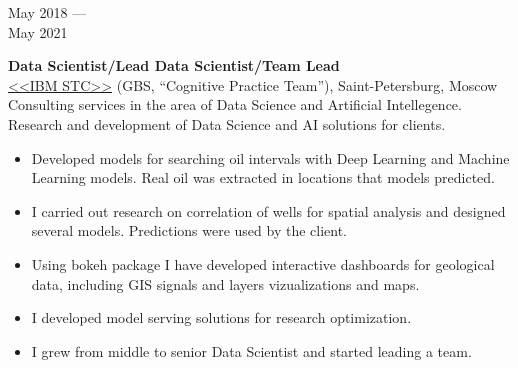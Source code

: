 \documentclass[10pt,a4paper]{article}
\newcommand{\lmpratio}{0.15}
\newcommand{\rmpratio}{0.74}
\newcommand{\vSpace}{0.5cm}
\newcommand{\horizontalSpace}{0.05\textwidth}
\newcommand{\sectionMain}[1]{\textbf{#1}}
\begin{document}
	\begin{minipage}[t]{\lmpratio\textwidth}
		May 2018 --- \\May 2021
	\end{minipage}
	\hspace{\horizontalSpace}
	\begin{minipage}[t]{\rmpratio\textwidth}
		\sectionMain{Data Scientist/Lead Data Scientist/Team Lead}\\
		\href{https://www.ibm.com/ru/rstl/index-en.html}{<<IBM STC>>} (GBS, ``Cognitive Practice Team''), Saint-Petersburg, Moscow\\[0.1cm]
  
Consulting services in the area of Data Science and Artificial Intellegence.
Research and development of Data Science and AI solutions for clients.
  
		\begin{itemize}
                \item 
Developed models for searching oil intervals with Deep Learning and Machine Learning models.
Real oil was extracted in locations that models predicted.
                \item 
I carried out research on correlation of wells for spatial analysis and designed several models.
Predictions were used by the client.
                \item
Using bokeh package I have developed interactive dashboards for geological data, including GIS signals and layers vizualizations and maps.
                \item
I developed model serving solutions for research optimization.
                \item
I grew from middle to senior Data Scientist and started leading a team.
            \end{itemize}
		
	\end{minipage}	
	\vspace{\vSpace}
	
\end{document}
